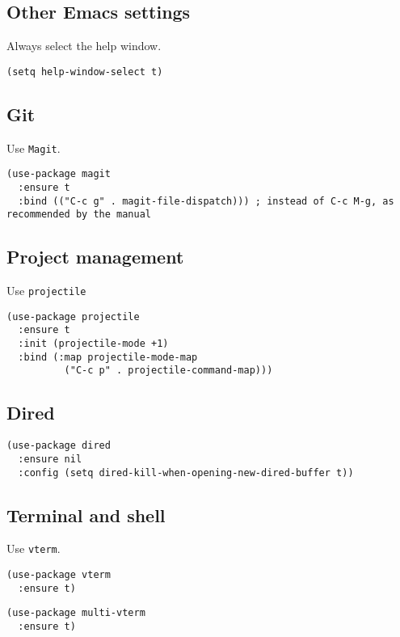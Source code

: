 \documentclass[a4paper,11pt]{article}
\begin{document}
\subsection{Other Emacs settings}
\label{sec:org4a4838e}
Always select the help window.
\begin{verbatim}
(setq help-window-select t)
\end{verbatim}

\subsection{Git}
\label{sec:org57b26c7}
Use \texttt{Magit}.
\begin{verbatim}
(use-package magit
  :ensure t
  :bind (("C-c g" . magit-file-dispatch))) ; instead of C-c M-g, as recommended by the manual
\end{verbatim}

\subsection{Project management}
\label{sec:org03034a3}
Use \texttt{projectile}
\begin{verbatim}
(use-package projectile
  :ensure t
  :init (projectile-mode +1)
  :bind (:map projectile-mode-map
	      ("C-c p" . projectile-command-map)))
\end{verbatim}

\subsection{Dired}
\label{sec:org36db846}
\begin{verbatim}
(use-package dired
  :ensure nil
  :config (setq dired-kill-when-opening-new-dired-buffer t))
\end{verbatim}

\subsection{Terminal and shell}
\label{sec:orgb1d4201}
Use \texttt{vterm}.
\begin{verbatim}
(use-package vterm
  :ensure t)
\end{verbatim}

\begin{verbatim}
(use-package multi-vterm
  :ensure t)
\end{verbatim}
\end{document}
